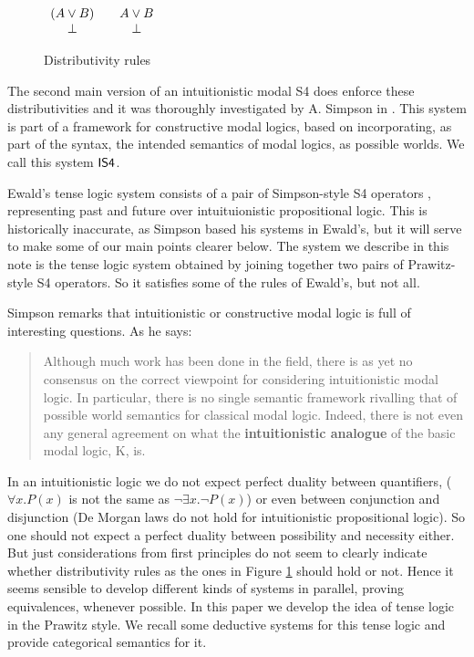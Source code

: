 \documentclass{article}
\let\Diamond\relax
\let\to\relax
\newcommand{\to}{\rightarrow}
\begin{document}
\begin{figure}
  \begin{mdframed}
  \begin{center}
      \begin{math}
        \begin{array}{ccc}
        \Diamond (A \lor B) &\to &\Diamond A \lor \Diamond B\\
        \Diamond \bot &\to &\bot
        \end{array}
       \end{math}
\end{center}
 \end{mdframed}
  \caption{Distributivity rules}
  \label{distrib}
\end{figure}


The second main version of an intuitionistic modal S4 does enforce these distributivities and it was thoroughly investigated by A. Simpson in \cite{simpson1994}. This system is part of a framework for constructive modal logics, based on incorporating, as part of the syntax, the intended semantics of modal logics, as possible worlds. We call this system $\sf IS4$. 

Ewald's tense logic system consists of a pair of Simpson-style S4 operators \cite{simpson1994},
representing past and future over intuituionistic propositional logic. This is historically inaccurate, as Simpson based his systems in Ewald's, but it will serve to make some of our main points clearer below. The system we describe in this note is the tense logic system obtained by joining together two pairs of Prawitz-style S4 operators. So it satisfies some of the rules of Ewald's, but not all.

Simpson remarks that intuitionistic or constructive modal logic is full of interesting questions. As he says:
\begin{quote}
Although much work has been done in the field, there is as yet no consensus on the correct viewpoint for considering intuitionistic modal logic.  In particular, there is no single semantic framework rivalling that of possible world semantics for classical modal logic. Indeed, there is not even any general agreement on what the \textbf{intuitionistic analogue} of the basic modal logic, K, is.
\end{quote}
In an intuitionistic logic we do not expect perfect duality between quantifiers, ($\forall x.P(x)$ is not the same as $\neg \exists x.\neg
P(x)$) or even between conjunction and disjunction (De Morgan laws do not hold for intuitionistic propositional logic). So one should not expect a perfect duality between possibility and necessity either. But just considerations from first principles do not seem to clearly indicate whether distributivity rules as the ones in Figure \ref{distrib} should hold or not. Hence it seems sensible to develop different kinds of systems in parallel, proving equivalences, whenever possible. In this paper we develop the idea of tense logic in the Prawitz style. We recall some deductive systems for this tense logic and provide categorical semantics for it.
\end{document}
